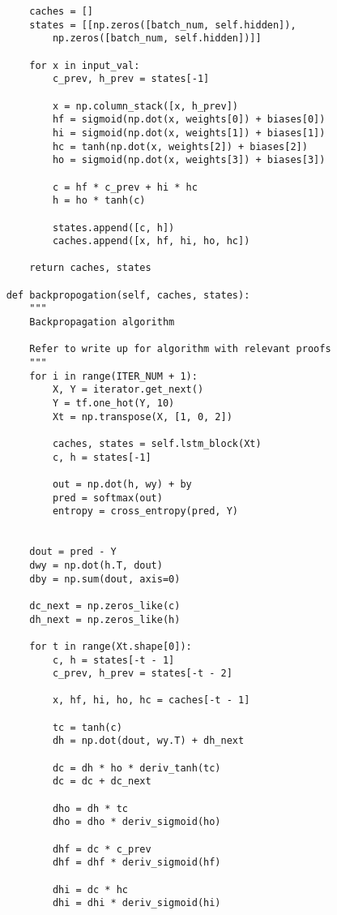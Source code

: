 \documentclass{article}
\begin{document}
\begin{lstlisting}
        caches = []
        states = [[np.zeros([batch_num, self.hidden]),
            np.zeros([batch_num, self.hidden])]]

        for x in input_val:
            c_prev, h_prev = states[-1]

            x = np.column_stack([x, h_prev])
            hf = sigmoid(np.dot(x, weights[0]) + biases[0])
            hi = sigmoid(np.dot(x, weights[1]) + biases[1])
            hc = tanh(np.dot(x, weights[2]) + biases[2])
            ho = sigmoid(np.dot(x, weights[3]) + biases[3])

            c = hf * c_prev + hi * hc
            h = ho * tanh(c)

            states.append([c, h])
            caches.append([x, hf, hi, ho, hc])

        return caches, states

    def backpropogation(self, caches, states):
        """
        Backpropagation algorithm

        Refer to write up for algorithm with relevant proofs
        """
        for i in range(ITER_NUM + 1):
            X, Y = iterator.get_next()
            Y = tf.one_hot(Y, 10)
            Xt = np.transpose(X, [1, 0, 2])

            caches, states = self.lstm_block(Xt)
            c, h = states[-1]

            out = np.dot(h, wy) + by
            pred = softmax(out)
            entropy = cross_entropy(pred, Y)


        dout = pred - Y
        dwy = np.dot(h.T, dout)
        dby = np.sum(dout, axis=0)

        dc_next = np.zeros_like(c)
        dh_next = np.zeros_like(h)

        for t in range(Xt.shape[0]):
            c, h = states[-t - 1]
            c_prev, h_prev = states[-t - 2]

            x, hf, hi, ho, hc = caches[-t - 1]

            tc = tanh(c)
            dh = np.dot(dout, wy.T) + dh_next

            dc = dh * ho * deriv_tanh(tc)
            dc = dc + dc_next

            dho = dh * tc
            dho = dho * deriv_sigmoid(ho)

            dhf = dc * c_prev
            dhf = dhf * deriv_sigmoid(hf)

            dhi = dc * hc
            dhi = dhi * deriv_sigmoid(hi)


\end{lstlisting}
\end{document}
